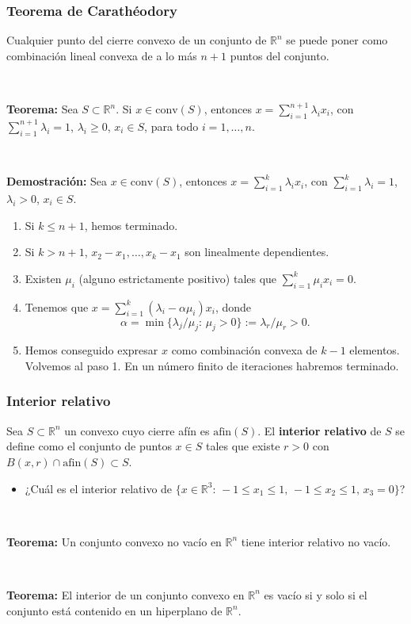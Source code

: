 \documentclass{beamer}
\begin{document}
\begin{frame}
\frametitle{Teorema de Carathéodory}

Cualquier punto del cierre convexo de un conjunto de $\mathbb{R}^n$ se puede poner como combinación lineal convexa de a lo más $n+1$ puntos del conjunto.

\



\textbf{Teorema:} Sea $S\subset \mathbb{R}^n$. Si $x\in\mbox{conv}(S)$, entonces $x=\sum_{i=1}^{n+1}\lambda_i x_i$, con $\sum_{i=1}^{n+1}\lambda_i=1$, $\lambda_i\geq 0$, $x_i\in S$, para todo $i=1,\ldots, n$.

\

{\scriptsize
\textbf{Demostración:} Sea $x\in\mbox{conv}(S)$, entonces $x=\sum_{i=1}^{k}\lambda_i x_i$, con $\sum_{i=1}^{k}\lambda_i=1$, $\lambda_i> 0$, $x_i\in S$.

\begin{enumerate}
\item Si $k\leq n+1$, hemos terminado.
\item Si $k > n+1$, $x_2-x_1,\ldots, x_k-x_1$ son linealmente dependientes.
\item Existen $\mu_i$ (alguno estrictamente positivo) tales que $\sum_{i=1}^{k}\mu_i x_i=0$.
\item Tenemos que $x=\sum_{i=1}^k (\lambda_i-\alpha\mu_i)x_i$, donde
\[
\alpha = \min\{\lambda_j/\mu_j:\, \mu_j>0\}:=\lambda_r/\mu_r > 0.
\]
\item Hemos conseguido expresar $x$ como combinación convexa de $k-1$ elementos. Volvemos al paso 1. En un número finito de iteraciones habremos terminado.
\end{enumerate}
}
\end{frame}
\begin{frame}
\frametitle{Interior relativo}

Sea $S\subset\mathbb{R}^n$ un convexo cuyo cierre afín es $\mbox{afin}(S)$. El \textbf{interior relativo} de $S$ se define como el conjunto de puntos $x\in S$ tales que existe $r>0$ con $B(x,r)\cap \mbox{afin}(S) \subset S$.

\begin{itemize}
\item ¿Cuál es el interior relativo de $\{x\in \mathbb{R}^3:\, -1\leq x_1\leq 1,\, -1\leq x_2\leq 1,\, x_3=0\}$?
\end{itemize}

\

\textbf{Teorema:} Un conjunto convexo no vacío en $\mathbb{R}^n$ tiene interior relativo no vacío.

\

\textbf{Teorema:} El interior de un conjunto convexo  en $\mathbb{R}^n$ es vacío si y solo si el conjunto está contenido en un hiperplano de $\mathbb{R}^n$.


\end{frame}
\end{document}

